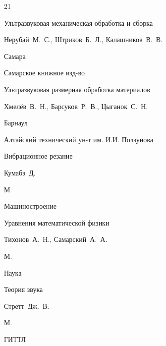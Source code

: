 \begin{thebibliography}{21}




\book Ультразвуковая механическая обработка и сборка

\by Нерубай~М.~С., Штриков~Б.~Л., Калашников~В.~В.

\publaddr Самара

\publ Самарское книжное изд-во






\book Ультразвуковая размерная обработка материалов

\by Хмелёв~В.~Н., Барсуков~Р.~В., Цыганок~С.~Н.

\publaddr Барнаул

\publ Алтайский технический ун-т им. И.И. Ползунова








\book Вибрационное резание

\by Кумабэ~Д.

\publaddr М.

\publ Машиностроение






\book Уравнения математической физики

\by Тихонов~А.~Н., Самарский~А.~А.

\publaddr М.

\publ Наука








\book Теория звука

\by Стретт~Дж.~В.

\publaddr М.

\publ ГИТТЛ







\end{thebibliography}
